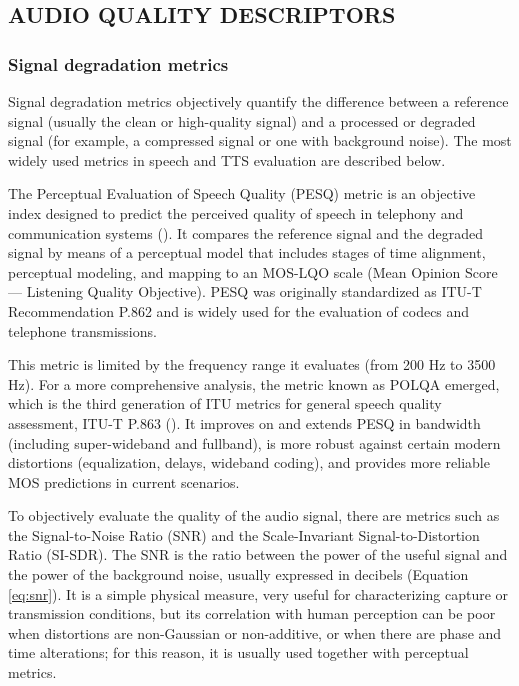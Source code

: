 \subsection{AUDIO QUALITY DESCRIPTORS}
\subsubsection{Signal degradation metrics}

Signal degradation metrics objectively quantify the difference between a reference signal (usually the clean or high-quality signal) and a processed or degraded signal (for example, a compressed signal or one with background noise). The most widely used metrics in speech and TTS evaluation are described below.

The Perceptual Evaluation of Speech Quality (PESQ) metric is an objective index designed to predict the perceived quality of speech in telephony and communication systems (\cite{ITU-T_P.862}). It compares the reference signal and the degraded signal by means of a perceptual model that includes stages of time alignment, perceptual modeling, and mapping to an MOS-LQO scale (Mean Opinion Score — Listening Quality Objective). PESQ was originally standardized as ITU-T Recommendation P.862 and is widely used for the evaluation of codecs and telephone transmissions.

This metric is limited by the frequency range it evaluates (from 200 Hz to 3500 Hz). For a more comprehensive analysis, the metric known as POLQA emerged, which is the third generation of ITU metrics for general speech quality assessment, ITU-T P.863 (\cite{ITU-T_P.863_2018}). It improves on and extends PESQ in bandwidth (including super-wideband and fullband), is more robust against certain modern distortions (equalization, delays, wideband coding), and provides more reliable MOS predictions in current scenarios.

To objectively evaluate the quality of the audio signal, there are metrics such as the Signal-to-Noise Ratio (SNR) and the Scale-Invariant Signal-to-Distortion Ratio (SI-SDR). The SNR is the ratio between the power of the useful signal and the power of the background noise, usually expressed in decibels (Equation \ref{eq:snr}). It is a simple physical measure, very useful for characterizing capture or transmission conditions, but its correlation with human perception can be poor when distortions are non-Gaussian or non-additive, or when there are phase and time alterations; for this reason, it is usually used together with perceptual metrics.

